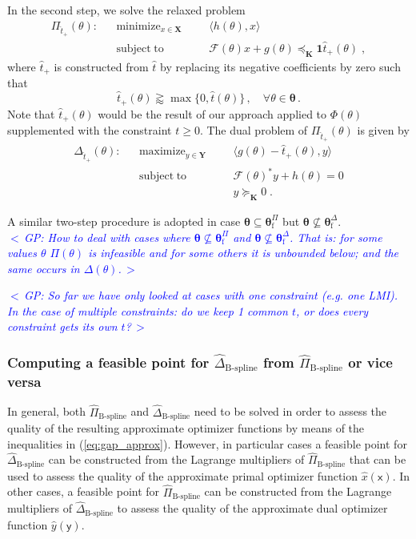 \documentclass{article}
\DeclareMathOperator*{\minimize}{minimize}
\DeclareMathOperator*{\maximize}{maximize}
\DeclareMathOperator*{\subj}{subject\;to}
\newcommand{\commentGP}[1]{\noindent \textcolor{blue}{\emph{$<\,$GP: #1$\,>$}}}%
\newcommand{\feas}{\mathrm{f}}              %
\newcommand{\ppar}{\theta}                          %
\newcommand{\Ppar}{{\bm{\theta}}}                   %
\newcommand{\X}{\mathbf{X}}                         %
\newcommand{\Y}{\mathbf{Y}}                         %
\newcommand{\K}{\mathbf{K}}                         %
\newcommand{\calF}{\mathcal{F}}                     %
\newcommand{\Pfeas}{\Ppar^\Pi_\feas}                %
\newcommand{\Dfeas}{\Ppar^\Delta_\feas}             %
\newcommand{\cx}{\textsf{x}}        %
\newcommand{\cy}{\textsf{y}}        %
\begin{document}
In the second step, we solve the relaxed problem
\[ \begin{aligned}
\Pi_{\hat{t}_+}(\ppar): && \minimize_{x\in\X} &&& \langle h(\ppar), x \rangle\\%
                        && \subj              &&& \calF(\ppar)x +g(\ppar)\preceq_\K \mathbf{1} \hat{t}_+(\ppar)  \;,%
\end{aligned} \]
where $\hat{t}_+$ is constructed from $\hat{t}$ by replacing its negative coefficients by zero such that
\[ \hat{t}_+(\ppar) \gtrapprox \max\{0, \hat{t}(\ppar)\}\,,\quad\forall\ppar\in\Ppar\,.%
\]
Note that $\hat{t}_+(\ppar)$ would be the result of our approach applied to $\Phi(\ppar)$ supplemented with the constraint $t\geq0$. The dual problem of $\Pi_{\hat{t}_+}(\ppar)$ is given by
\[ \begin{aligned}
\Delta_{\hat{t}_+}(\ppar): && \maximize_{y\in\Y} &&& \langle g(\ppar) - \hat{t}_+(\ppar), y \rangle\\%
               && \subj              &&& \calF(\ppar)^* y + h(\ppar)= 0\\
               &&                    &&& y \succeq_\K 0  \;.
\end{aligned}\]

A similar two-step procedure is adopted in case $\Ppar\subseteq\Pfeas$ but $\Ppar\nsubseteq\Dfeas$.\\

\commentGP{How to deal with cases where $\Ppar\nsubseteq\Pfeas$ and $\Ppar\nsubseteq\Dfeas$. That is: for some values $\ppar$ $\Pi(\ppar)$ is infeasible and for some others it is unbounded below; and the same occurs in $\Delta(\ppar)$.}

\commentGP{So far we have only looked at cases with one constraint (e.g. one LMI). In the case of multiple constraints: do we keep 1 common $t$, or does every constraint gets its own $t$?}


\subsubsection{Computing a feasible point for $\hat{\Delta}_{\text{B-spline}}$ from $\hat{\Pi}_{\text{B-spline}}$ or vice versa}%

In general, both $\hat{\Pi}_{\text{B-spline}}$ and $\hat{\Delta}_{\text{B-spline}}$ need to be solved in order to assess the quality of the resulting approximate optimizer functions by means of the inequalities in (\ref{eq:gap_approx}). However, in particular cases a feasible point for $\hat{\Delta}_{\text{B-spline}}$ can be constructed from the Lagrange multipliers of $\hat{\Pi}_{\text{B-spline}}$ that can be used to assess the quality of the approximate primal optimizer function $\hat{x}(\cx)$. In other cases, a feasible point for $\hat{\Pi}_{\text{B-spline}}$ can be constructed from the Lagrange multipliers of $\hat{\Delta}_{\text{B-spline}}$ to assess the quality of the approximate dual optimizer function $\hat{y}(\cy)$.
\end{document}
